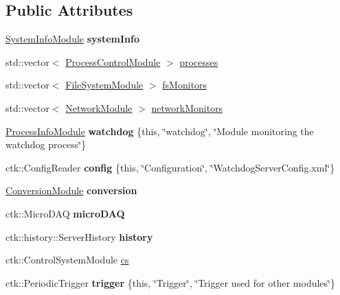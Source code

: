 \subsection*{Public Attributes}
\begin{DoxyCompactItemize}
\item 
\hyperlink{classSystemInfoModule}{System\+Info\+Module} {\bfseries system\+Info}
\item 
std\+::vector$<$ \hyperlink{structProcessControlModule}{Process\+Control\+Module} $>$ \hyperlink{structWatchdogServer_af21c89fb581f3f8ff9d3cf02509634c1}{processes}
\item 
std\+::vector$<$ \hyperlink{structFileSystemModule}{File\+System\+Module} $>$ \hyperlink{structWatchdogServer_a6dea91943e4456bf4ca8f9f4995ec6d2}{fs\+Monitors}
\item 
std\+::vector$<$ \hyperlink{structNetworkModule}{Network\+Module} $>$ \hyperlink{structWatchdogServer_a9a96dd4fa6053b7b783e43c5d446d7f0}{network\+Monitors}
\item 
\hyperlink{structProcessInfoModule}{Process\+Info\+Module} {\bfseries watchdog} \{this, \char`\"{}watchdog\char`\"{}, \char`\"{}Module monitoring the watchdog process\char`\"{}\}\hypertarget{structWatchdogServer_a5284e735372ca5947a8105ad3167c54a}{}\label{structWatchdogServer_a5284e735372ca5947a8105ad3167c54a}

\item 
ctk\+::\+Config\+Reader {\bfseries config} \{this, \char`\"{}Configuration\char`\"{}, \char`\"{}Watchdog\+Server\+Config.\+xml\char`\"{}\}\hypertarget{structWatchdogServer_aff0de39ddfc412f63c5ea21dafc89ddd}{}\label{structWatchdogServer_aff0de39ddfc412f63c5ea21dafc89ddd}

\item 
\hyperlink{structConversionModule}{Conversion\+Module} {\bfseries conversion}\hypertarget{structWatchdogServer_afa7e520c6049b1574c429f776196de6c}{}\label{structWatchdogServer_afa7e520c6049b1574c429f776196de6c}

\item 
ctk\+::\+Micro\+D\+AQ {\bfseries micro\+D\+AQ}\hypertarget{structWatchdogServer_a886ae70481b26aa4a59915f3c0e28a56}{}\label{structWatchdogServer_a886ae70481b26aa4a59915f3c0e28a56}

\item 
ctk\+::history\+::\+Server\+History {\bfseries history}\hypertarget{structWatchdogServer_a5250e08f8ba03bab3d1ac56f64134723}{}\label{structWatchdogServer_a5250e08f8ba03bab3d1ac56f64134723}

\item 
ctk\+::\+Control\+System\+Module \hyperlink{structWatchdogServer_ac2a80d4a412c142f8d4753b51e12bfa3}{cs}
\item 
ctk\+::\+Periodic\+Trigger {\bfseries trigger} \{this, \char`\"{}Trigger\char`\"{}, \char`\"{}Trigger used for other modules\char`\"{}\}\hypertarget{structWatchdogServer_ad28386ab5c73d0f07dbafd7a6a738cfb}{}\label{structWatchdogServer_ad28386ab5c73d0f07dbafd7a6a738cfb}

\end{DoxyCompactItemize}


